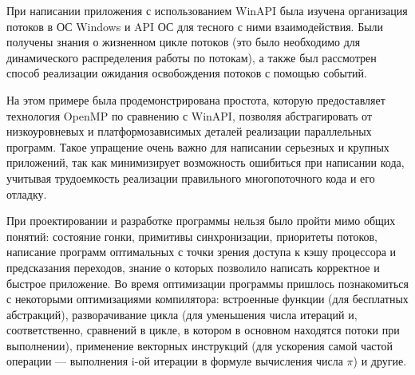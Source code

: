 \documentclass[a4paper,14pt]{extarticle}
\begin{document}
При написании приложения с использованием WinAPI была изучена организация
потоков в ОС Windows и API ОС для тесного с ними взаимодействия. Были получены
знания о жизненном цикле потоков (это было необходимо для динамического
распределения работы по потокам), а также был рассмотрен способ реализации
ожидания освобождения потоков с помощью событий.

На этом примере была продемонстрирована простота, которую предоставляет
технология OpenMP по сравнению с WinAPI, позволяя абстрагировать от
низкоуровневых и платформозависимых деталей реализации параллельных программ.
Такое упращение очень важно для написании серьезных и крупных приложений, так
как минимизирует возможность ошибиться при написании кода, учитывая
трудоемкость реализации правильного многопоточного кода и его отладку.

При проектировании и разработке программы нельзя было пройти мимо общих
понятий: состояние гонки, примитивы синхронизации, приоритеты потоков,
написание программ оптимальных с точки зрения доступа к кэшу процессора и
предсказания переходов, знание о которых позволило написать корректное и быстрое
приложение. Во время оптимизации программы пришлось познакомиться с некоторыми
оптимизациями компилятора: встроенные функции (для бесплатных абстракций),
разворачивание цикла (для уменьшения числа итераций и, соответственно,
сравнений в цикле, в котором в основном находятся потоки при выполнении), применение
векторных инструкций (для ускорения самой частой операции --- выполнения i-ой
итерации в формуле вычисления числа $\pi$) и другие.
\end{document}
